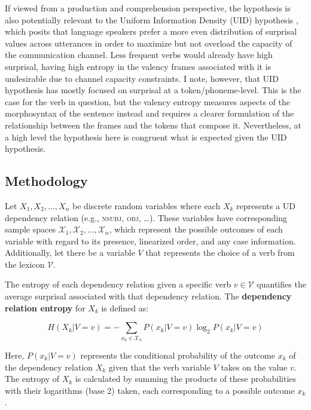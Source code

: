If viewed from a production and comprehension perspective, the hypothesis is also potentially relevant to the Uniform Information Density (UID) hypothesis \citep{fenk1980,levy2006}, which posits that language speakers prefer a more even distribution of surprisal values across utterances in order to maximize but not overload the capacity of the communication channel. Less frequent verbs would already have high surprisal, having high entropy in the valency frames associated with it is undesirable due to channel capacity constraints. I note, however, that UID hypothesis has mostly focused on surprisal at a token/phoneme-level. This is the case for the verb in question, but the valency entropy measures aspects of the morphosyntax of the sentence instead and requires a clearer formulation of the relationship between the frames and the tokens that compose it. Nevertheless, at a high level the hypothesis here is congruent what is expected given the UID hypothesis.

\subsection{Methodology}

Let $X_1, X_2,\ldots,X_n$ be discrete random variables where each $X_k$ represents a UD dependency relation (e.g., \textsc{nsubj}, \textsc{obj}, \ldots). These variables have corresponding sample spaces $\mathcal{X}_1, \mathcal{X}_2, \ldots, \mathcal{X}_n$, which represent the possible outcomes of each variable with regard to its presence, linearized order, and any case information. Additionally, let there be a variable $V$ that represents the choice of a verb from the lexicon $\mathcal{V}$. 

The entropy of each dependency relation given a specific verb $v \in \mathcal{V}$ quantifies the average surprisal associated with that dependency relation. The \textbf{dependency relation entropy} for  $X_k$ is defined as:

\begin{equation*}
  H(X_{k}|V=v)=
  -\sum\limits_{x_{k}\in{}\mathcal{X}_{k}}{P(x_{k}|V=v)\log_{2}{P(x_{k}|V=v)}}  
\end{equation*}

Here, $P(x_k | V = v)$ represents the conditional probability of the outcome $x_k$ of the dependency relation $X_k$ given that the verb variable $V$ takes on the value $v$. The entropy of $X_k$ is calculated by summing the products of these probabilities with their logarithms (base 2) taken, each corresponding to a possible outcome $x_k$.

